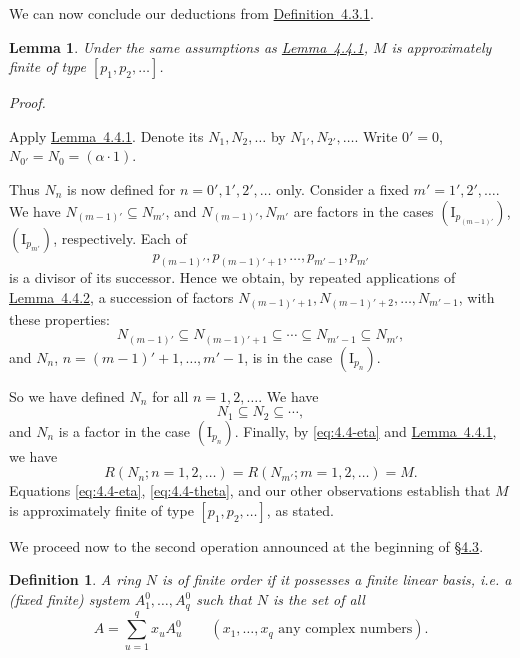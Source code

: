 \documentclass[b5paper,twoside]{article}
\newcommand{\secref}[2]{\hyperref[#1]{\mbox{\S#2}}}
\newcommand{\lemref}[2]{\hyperref[#1]{\mbox{Lemma~#2}}}
\newcommand{\defref}[2]{\hyperref[#1]{\mbox{Definition~#2}}}
\theoremstyle{mvnplain}
\newtheorem{lemma}{Lemma}[section]
\newtheorem{definition}{Definition}[section]
\renewenvironment{proof}[1][Proof]{%
  \par\addvspace{0.35\baselineskip}%
  \noindent\textit{#1.}\ \normalfont\ignorespaces
}{%
  \par\addvspace{0.35\baselineskip}%
}
\newcommand{\M}{\mathbf M}
\newcommand{\N}{\mathbf N}
\newcommand{\R}{\mathbf R}
\def\M{M}%
\def\N{N}%
\def\R{R}%
\begin{document}
We can now conclude our deductions from \defref{def:4.3.1}{4.3.1}.

\begin{lemma}\label{lem:4.4.3}
Under the same assumptions as \lemref{lem:4.4.1}{4.4.1}, \(\M\) is
approximately finite of type \([p_1,p_2,\ldots]\).
\end{lemma}

\begin{proof}
Apply \lemref{lem:4.4.1}{4.4.1}. Denote its \(\N_1,\N_2,\ldots\) by
\(\N_{1'},\N_{2'},\ldots\). Write \(0'=0\),
\(\N_{0'}=\N_0=(\alpha\mathbin{\cdot}1)\).

Thus \(\N_n\) is now defined for \(n=0',1',2',\ldots\) only. Consider a
fixed \(m'=1',2',\ldots\). We have
\(\N_{(m-1)'}\subseteq\N_{m'}\), and \(\N_{(m-1)'},\N_{m'}\) are factors in
the cases \((\mathrm I_{p_{(m-1)'}})\), \((\mathrm I_{p_{m'}})\), respectively.
Each of
\[
 p_{(m-1)'},p_{(m-1)'+1},\ldots,p_{m'-1},p_{m'}
\]
is a divisor of its successor. Hence we obtain, by repeated applications of
\lemref{lem:4.4.2}{4.4.2}, a succession of factors
\(\N_{(m-1)'+1},\N_{(m-1)'+2},\ldots,\N_{m'-1}\), with these properties:
\[
 \N_{(m-1)'}\subseteq\N_{(m-1)'+1}\subseteq\cdots
 \subseteq\N_{m'-1}\subseteq\N_{m'},
\]
and \(\N_n\), \(n=(m-1)'+1,\ldots,m'-1\), is in the case
\((\mathrm I_{p_n})\).

So we have defined \(\N_n\) for all \(n=1,2,\ldots\). We have
\begin{equation}\tag{4.4.\(\eta\)}\label{eq:4.4-eta}
 \N_1\subseteq\N_2\subseteq\cdots,
\end{equation}
and \(\N_n\) is a factor in the case \((\mathrm I_{p_n})\). Finally, by
\eqref{eq:4.4-eta} and \lemref{lem:4.4.1}{4.4.1}, we have
\begin{equation}\tag{4.4.\(\theta\)}\label{eq:4.4-theta}
 \R(\N_n;n=1,2,\ldots)=\R(\N_{m'};m=1,2,\ldots)=\M.
\end{equation}
Equations \eqref{eq:4.4-eta}, \eqref{eq:4.4-theta}, and our other observations
establish that \(\M\) is approximately finite of type
\([p_1,p_2,\ldots]\), as stated.
\end{proof}

We proceed now to the second operation announced at the beginning of
\secref{sec:4.3}{4.3}.

\begin{definition}\label{def:4.5.1}
A ring \(\N\) is of finite order if it possesses a finite linear basis, i.e. a
(fixed finite) system \(A^0_1,\ldots,A^0_q\) such that \(\N\) is the set of all
\[
 A=\sum_{u=1}^{q}x_uA^0_u
 \qquad(x_1,\ldots,x_q\text{ any complex numbers}).
\]
\end{definition}
\end{document}
